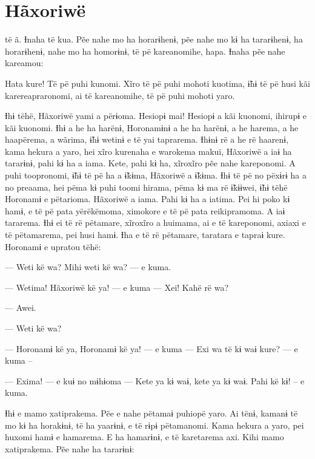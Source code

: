 
\chapter{Hãxoriwë}

 të ã. Ɨnaha të kua. Pẽe nahe mo ha horarɨhenɨ, pẽe nahe mo kɨ
ha tararɨhenɨ, ha horarɨhenɨ, nahe mo ha homorɨnɨ, të pë kareanomihe,
hapa. Ɨnaha pẽe nahe kareamou: 

Hata kure! Të pë puhi kunomi. Xĩro të pë puhi mohoti kuotima, ɨ̃hɨ të pë
husi kãi karereapraronomi, ai të kareanomihe, të pë puhi mohoti yaro. 

Ɨhɨ tëhë, Hãxoriwë yami a përɨoma. Hesiopɨ mai! Hesiopɨ a kãi kuonomi,
ihirupɨ e kãi kuonomi. Ɨhɨ a he ha harënɨ, Horonamɨnɨ a he ha harënɨ, a
he harema, a he haapërema, a wãrima, ɨ̃hɨ wetinɨ e të yai taprarema.
Ɨhɨnɨ rë a he rë haarenɨ, kama hekura a yaro, hei xĩro kurenaha e
warokema makui, Hãxoriwë a iaɨ ha tararɨnɨ, pahi kɨ ha a iama. Kete,
pahi kɨ ha, xĩroxĩro pẽe nahe kareponomi. A puhi toopronomi, ɨ̃hɨ të pë
ha a ɨ̃kɨma, Hãxoriwë a ɨ̃kɨma. Ɨhɨ të pë no pëxɨrɨ ha a no preaama, hei
pëma kɨ puhi toomi hirama, pëma kɨ ma rë ɨ̃kɨɨwei, ɨ̃hɨ tëhë Horonamɨ e
pëtarioma. Hãxoriwë a iama. Pahi kɨ ha a iatima. Pei hi poko kɨ hamɨ, e
të pë pata yërëkëmoma, ximokore e të pë pata reikipramoma. A iaɨ
tararema. Ɨhɨ ei të rë pëtamare, xĩroxĩro a huimama, ai e të kareponomi,
axiaxi e të pëtamarema, pei husi hamɨ. Ɨha e të rë pëtamare, taratara e
tapraɨ kure. Horonamɨ e upratou tëhë: 

--- Weti kë wa? Mihi weti kë wa? --- e kuma. 

--- Wetima! Hãxoriwë kë ya! --- e kuma --- Xei! Kahë rë wa? 

--- Awei. 

--- Weti kë wa?

--- Horonamɨ kë ya, Horonamɨ kë ya! --- e kuma --- Exi wa të kɨ waɨ kure?
--- e kuma -- 

--- Exima! --- e kuɨ no mɨhɨoma --- Kete ya kɨ waɨ, kete ya kɨ waɨ. Pahi kë
kɨ! -- e kuma. 

Ɨhɨ e mamo xatiprakema. Pẽe e nahe pëtamaɨ puhiopë yaro. Ai tënɨ, kamanɨ
të mo kɨ ha horakɨnɨ, të ha yaarɨnɨ, e të rɨpɨ pëtamanomi. Kama hekura a
yaro, pei huxomi hamɨ e hamarema. E ha hamarɨnɨ, e të karetarema axi.
Kihi mamo xatiprakema. Pẽe nahe ha tararɨnɨ: 

